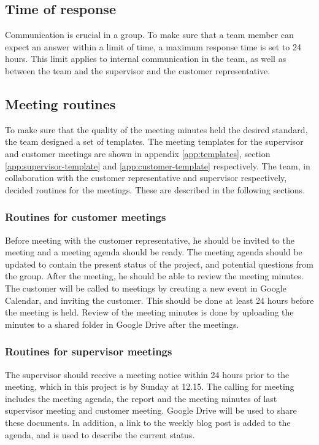 \subsection{Time of response}
Communication is crucial in a group.\cite{teamwork} To make sure that a team member can expect an answer within a limit of time, a maximum response time is set to 24 hours. This limit applies to internal communication in the team, as well as between the team and the supervisor and the customer representative.

\subsection{Meeting routines}
To make sure that the quality of the meeting minutes held the desired standard, the team designed a set of templates. The meeting templates for the supervisor and customer meetings are shown in appendix \ref{app:templates}, section \ref{app:supervisor-template} and \ref{app:customer-template} respectively.
The team, in collaboration with the customer representative and supervisor respectively, decided routines for the meetings. These are described in the following sections.

\subsubsection{Routines for customer meetings}
  Before meeting with the customer representative, he should be invited to the meeting and a meeting agenda should be ready. The meeting agenda should be updated to contain the present status of the project, and potential questions from the group. 
  After the meeting, he should be able to review the meeting minutes. 
  The customer will be called to meetings by creating a new event in Google Calendar, and inviting the customer. This should be done at least 24 hours before the meeting is held.
  Review of the meeting minutes is done by uploading the minutes to a shared folder in Google Drive after the meetings. %

   		
\subsubsection{Routines for supervisor meetings}
  The supervisor should receive a meeting notice within 24 hours prior to the meeting, which in this project is by Sunday at 12.15. The calling for meeting includes the meeting agenda, the report and the meeting minutes of last supervisor meeting and customer meeting. Google Drive will be used to share these documents. In addition, a link to the weekly blog post is added to the agenda, and is used to describe the current status.

